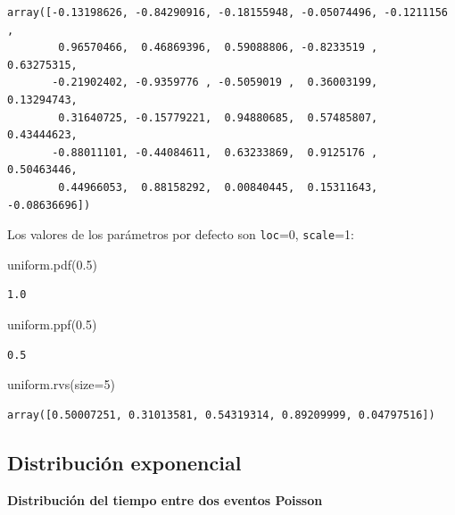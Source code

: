 \documentclass[
  letterpaper,
  DIV=11,
  numbers=noendperiod]{scrreprt}
\newenvironment{Shaded}{\begin{snugshade}}{\end{snugshade}}
\newcommand{\DecValTok}[1]{\textcolor[rgb]{0.68,0.00,0.00}{#1}}
\newcommand{\FloatTok}[1]{\textcolor[rgb]{0.68,0.00,0.00}{#1}}
\newcommand{\NormalTok}[1]{\textcolor[rgb]{0.00,0.23,0.31}{#1}}
\newcommand{\OperatorTok}[1]{\textcolor[rgb]{0.37,0.37,0.37}{#1}}
\begin{document}
\begin{verbatim}
array([-0.13198626, -0.84290916, -0.18155948, -0.05074496, -0.1211156 ,
        0.96570466,  0.46869396,  0.59088806, -0.8233519 ,  0.63275315,
       -0.21902402, -0.9359776 , -0.5059019 ,  0.36003199,  0.13294743,
        0.31640725, -0.15779221,  0.94880685,  0.57485807,  0.43444623,
       -0.88011101, -0.44084611,  0.63233869,  0.9125176 ,  0.50463446,
        0.44966053,  0.88158292,  0.00840445,  0.15311643, -0.08636696])
\end{verbatim}

Los valores de los parámetros por defecto son \texttt{loc}=0,
\texttt{scale}=1:

\begin{Shaded}
\begin{Highlighting}[]
\NormalTok{uniform.pdf(}\FloatTok{0.5}\NormalTok{)}
\end{Highlighting}
\end{Shaded}

\begin{verbatim}
1.0
\end{verbatim}

\begin{Shaded}
\begin{Highlighting}[]
\NormalTok{uniform.ppf(}\FloatTok{0.5}\NormalTok{)}
\end{Highlighting}
\end{Shaded}

\begin{verbatim}
0.5
\end{verbatim}

\begin{Shaded}
\begin{Highlighting}[]
\NormalTok{uniform.rvs(size}\OperatorTok{=}\DecValTok{5}\NormalTok{)}
\end{Highlighting}
\end{Shaded}

\begin{verbatim}
array([0.50007251, 0.31013581, 0.54319314, 0.89209999, 0.04797516])
\end{verbatim}

\hypertarget{distribuciuxf3n-exponencial}{%
\subsection{Distribución
exponencial}\label{distribuciuxf3n-exponencial}}

\textbf{Distribución del tiempo entre dos eventos Poisson}
\end{document}

